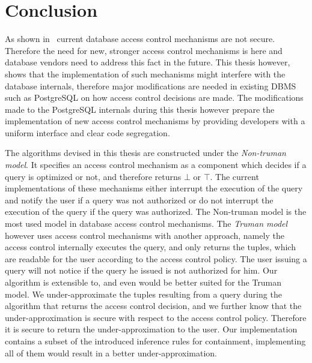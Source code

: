 \section{Conclusion}

As shown in~\cite{guarnieri2016strong} current database access control mechanisms are not secure.
%
Therefore the need for new, stronger access control mechanisms is here and database vendors need to address this fact in the future.
%
This thesis however, shows that the implementation of such mechanisms might interfere with the database internals, therefore major modifications are needed in existing DBMS such as PostgreSQL on how access control decisions are made.
%
The modifications made to the PostgreSQL internals during this thesis however prepare the implementation of new access control mechanisms by providing developers with a uniform interface and clear code segregation.

The algorithms devised in this thesis are constructed under the \emph{Non-truman model}.
%
It specifies an access control mechanism as a component which decides if a query is optimized or not, and therefore returns $\bot$ or $\top$.
%
The current implementations of these mechanisms either interrupt the execution of the query and notify the user if a query was not authorized or do not interrupt the execution of the query if the query was authorized.
%
The Non-truman model is the most used model in database access control mechanisms.
%
The \emph{Truman model} however uses access control mechanisms with another approach, namely the access control internally executes the query, and only returns the tuples, which are readable for the user according to the access control policy.
%
The user issuing a query will not notice if the query he issued is not authorized for him.
%
Our algorithm is extensible to, and even would be better suited for the Truman model.
%
We under-approximate the tuples resulting from a query during the algorithm that returns the access control decision, and we further know that the under-approximation is secure with respect to the access control policy.
%
Therefore it is secure to return the under-approximation to the user.
%
Our implementation contains a subset of the introduced inference rules for containment, implementing all of them would result in a better under-approximation.

